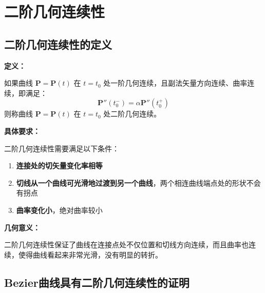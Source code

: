 \documentclass[12pt,a4paper]{article}
\begin{document}
\section{二阶几何连续性}

\subsection{二阶几何连续性的定义}

\begin{tcolorbox}[breakable]
\textbf{定义：}

如果曲线 $\mathbf{P} = \mathbf{P}(t)$ 在 $t = t_0$ 处一阶几何连续，且副法矢量方向连续、曲率连续，即满足：
\begin{equation}
\mathbf{P}''(t_0^-) = \alpha \mathbf{P}''(t_0^+)
\end{equation}
则称曲线 $\mathbf{P} = \mathbf{P}(t)$ 在 $t = t_0$ 处二阶几何连续。

\textbf{具体要求：}

二阶几何连续性需要满足以下条件：
\begin{enumerate}
\item \textbf{连接处的切矢量变化率相等}
\item \textbf{切线从一个曲线可光滑地过渡到另一个曲线}，两个相连曲线端点处的形状不会有拐点
\item \textbf{曲率变化小}，绝对曲率较小
\end{enumerate}

\textbf{几何意义：}

二阶几何连续性保证了曲线在连接点处不仅位置和切线方向连续，而且曲率也连续，使得曲线看起来非常光滑，没有明显的转折。
\end{tcolorbox}

\subsection{Bezier曲线具有二阶几何连续性的证明}
\end{document}
